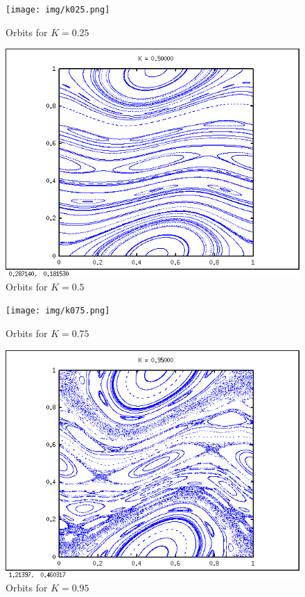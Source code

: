 \documentclass[a4paper,11pt]{article}
\begin{document}
\begin{figure}[H]
\centering
\begin{minipage}{0.5\textwidth}
\centering
\texttt{[image: img/k025.png]}
\caption{Orbits for $K = 0.25$}
\end{minipage}\hfill
\begin{minipage}{0.5\textwidth}
\centering
\includegraphics[width=\textwidth]{img/k05.png}
\caption{Orbits for $K = 0.5$}
\end{minipage}
\end{figure}

\begin{figure}[H]
\centering
\begin{minipage}{0.5\textwidth}
\centering
\texttt{[image: img/k075.png]}
\caption{Orbits for $K = 0.75$}
\end{minipage}\hfill
\begin{minipage}{0.5\textwidth}
\centering
\includegraphics[width=\textwidth]{img/k095.png}
\caption{Orbits for $K = 0.95$}
\end{minipage}
\end{figure}
\end{document}
